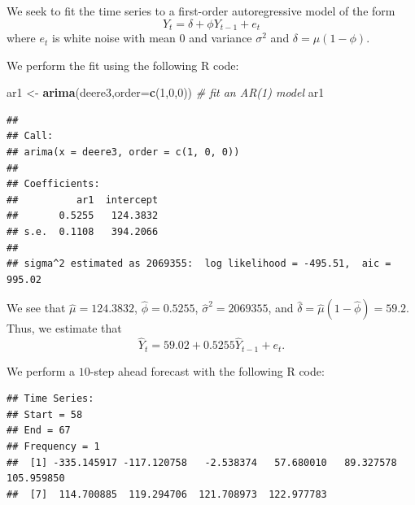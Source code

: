 \documentclass[
]{article}
\newenvironment{Shaded}{\begin{snugshade}}{\end{snugshade}}
\newcommand{\AttributeTok}[1]{\textcolor[rgb]{0.13,0.29,0.53}{#1}}
\newcommand{\CommentTok}[1]{\textcolor[rgb]{0.56,0.35,0.01}{\textit{#1}}}
\newcommand{\DecValTok}[1]{\textcolor[rgb]{0.00,0.00,0.81}{#1}}
\newcommand{\FunctionTok}[1]{\textcolor[rgb]{0.13,0.29,0.53}{\textbf{#1}}}
\newcommand{\NormalTok}[1]{#1}
\newcommand{\OtherTok}[1]{\textcolor[rgb]{0.56,0.35,0.01}{#1}}
\newcommand{\SpecialCharTok}[1]{\textcolor[rgb]{0.81,0.36,0.00}{\textbf{#1}}}
\begin{document}

We seek to fit the time series to a first-order autoregressive model of
the form \[
   Y_t = \delta + \phi Y_{t-1} + e_t
\] where \(e_t\) is white noise with mean \(0\) and variance
\(\sigma^2\) and \(\delta = \mu(1-\phi)\).

We perform the fit using the following R code:

\begin{Shaded}
\begin{Highlighting}[]
\NormalTok{ar1 }\OtherTok{\textless{}{-}} \FunctionTok{arima}\NormalTok{(deere3,}\AttributeTok{order=}\FunctionTok{c}\NormalTok{(}\DecValTok{1}\NormalTok{,}\DecValTok{0}\NormalTok{,}\DecValTok{0}\NormalTok{)) }\CommentTok{\# fit an AR(1) model}
\NormalTok{ar1}
\end{Highlighting}
\end{Shaded}

\begin{verbatim}
## 
## Call:
## arima(x = deere3, order = c(1, 0, 0))
## 
## Coefficients:
##          ar1  intercept
##       0.5255   124.3832
## s.e.  0.1108   394.2066
## 
## sigma^2 estimated as 2069355:  log likelihood = -495.51,  aic = 995.02
\end{verbatim}

We see that \(\hat{\mu} = 124.3832\), \(\hat{\phi} = 0.5255\),
\(\hat{\sigma}^2 = 2069355\), and
\(\hat{\delta} = \hat{\mu}(1-\hat{\phi}) = 59.2\). Thus, we estimate
that \[
   \hat{Y}_t = 59.02 + 0.5255 \hat{Y}_{t-1} + e_t.
\]

We perform a \(10\)-step ahead forecast with the following R code:

\begin{Shaded}
\end{Shaded}

\begin{verbatim}
## Time Series:
## Start = 58 
## End = 67 
## Frequency = 1 
##  [1] -335.145917 -117.120758   -2.538374   57.680010   89.327578  105.959850
##  [7]  114.700885  119.294706  121.708973  122.977783
\end{verbatim}
\end{document}

